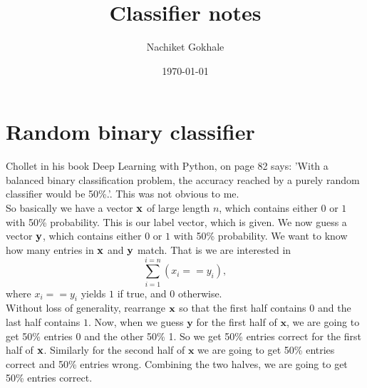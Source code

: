 \documentclass{article}
\newcommand{\beq}{\begin{equation}}
\newcommand{\eeq}{\end{equation}}
\begin{document}
\title{Classifier notes}
\author{Nachiket Gokhale}
\date{\today}
\maketitle
\section{Random binary classifier}
Chollet in his book Deep Learning with Python, on page 82 says: 'With a balanced binary classification
problem, the accuracy reached by a purely random classifier would be 50\%.'. This was not obvious to me.\\

So basically we have a vector ${\bf{x}}$ of large length $n$, which contains either $0$ or $1$ with 50\% probability. This is our label vector, which is given. We now guess a vector ${\bf{y}}$, which contains either $0$ or $1$ with 50\% probability. We want to know how many entries in ${\bf{x}}$ and ${\bf{y}}$ match. That is we are interested in
\beq
\sum_{i=1}^{i=n} (x_{i} == y_{i}), 
\eeq
where $x_{i} == y_{i}$ yields $1$ if true, and $0$ otherwise.\\

Without loss of generality, rearrange ${\bf{x}}$ so that the first half contains $0$ and the last half contains $1$.  Now, when we guess $\mathbf{y}$ for the first half of ${\mathbf{x}}$, we are going to get 50\% entries 0 and the other 50\% 1. So we get 50\% entries correct for the first half of ${\bf{x}}$. Similarly for the second half of ${\mathbf{x}}$ we are going to get 50\% entries correct and 50\% entries wrong. Combining the two halves, we are going to get 50\% entries correct.
\end{document}
